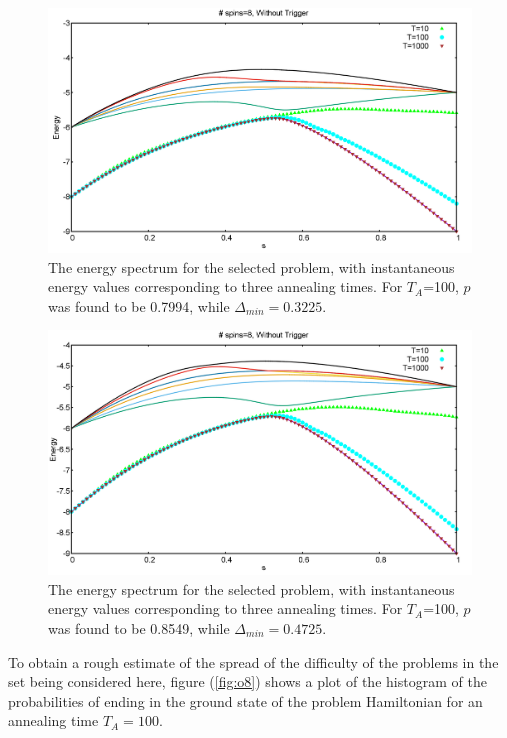 \documentclass[../main.tex]{subfiles}
\begin{document}
\begin{figure}[H]
\centering 
\includegraphics[scale=0.3]{79_s8_O.png}
\caption{The energy spectrum for the selected problem, with instantaneous energy values corresponding to three annealing times. For $T_A$=100, $p$ was found to be 0.7994, while $\Delta_{min}=0.3225.$}
\label{fig:o6}
\end{figure}
\begin{figure}[H]
\centering 
\includegraphics[scale=0.3]{59_s8_O.png}
\caption{The energy spectrum for the selected problem, with instantaneous energy values corresponding to three annealing times. For $T_A$=100, $p$ was found to be 0.8549, while $\Delta_{min}=0.4725.$}
\label{fig:o7}
\end{figure}
\newpage
To obtain a rough estimate of the spread of the difficulty of the problems in the set being considered here, figure (\ref{fig:o8}) shows a plot of the histogram of the probabilities of ending in the ground state of the problem Hamiltonian for an annealing time $T_A=100$. 
\end{document}
